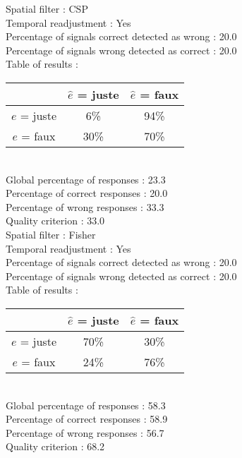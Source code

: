 Spatial filter : CSP \\
Temporal readjustment : Yes \\
Percentage of signals correct detected as wrong :   20.0 \\
Percentage of signals wrong detected as correct :   20.0 \\
Table of results : \\
\begin{tabular}{|c|c|c|}
\hline				& $\hat{e}$ = juste & $\hat{e}$ = faux \\
\hline  $e$ = juste	&      6\%			&     94\%		\\
\hline  $e$ = faux	&     30\%			&     70\%		\\
\hline
\end{tabular}\\
Global percentage of responses :   23.3 \\
Percentage of correct responses :   20.0 \\
Percentage of wrong responses :   33.3 \\
Quality criterion :   33.0 \\

Spatial filter : Fisher \\
Temporal readjustment : Yes \\
Percentage of signals correct detected as wrong :   20.0 \\
Percentage of signals wrong detected as correct :   20.0 \\
Table of results : \\
\begin{tabular}{|c|c|c|}
\hline				& $\hat{e}$ = juste & $\hat{e}$ = faux \\
\hline  $e$ = juste	&     70\%			&     30\%		\\
\hline  $e$ = faux	&     24\%			&     76\%		\\
\hline
\end{tabular}\\
Global percentage of responses :   58.3 \\
Percentage of correct responses :   58.9 \\
Percentage of wrong responses :   56.7 \\
Quality criterion :   68.2 \\

\newpage

